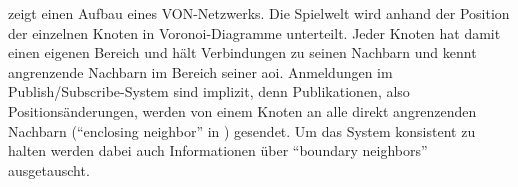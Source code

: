  zeigt einen Aufbau eines VON-Netzwerks. Die Spielwelt wird anhand der Position der einzelnen Knoten in Voronoi-Diagramme unterteilt. Jeder Knoten hat damit einen eigenen Bereich und hält Verbindungen zu seinen Nachbarn und kennt angrenzende Nachbarn im Bereich seiner \ac{aoi}. Anmeldungen im Publish/Subscribe-System sind implizit, denn Publikationen, also Positionsänderungen, werden von einem Knoten an alle direkt angrenzenden Nachbarn (``enclosing neighbor'' in ) gesendet. Um das System konsistent zu halten werden dabei auch Informationen über ``boundary neighbors'' ausgetauscht.
